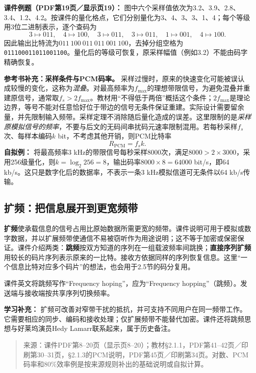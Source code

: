 \textbf{课件例题（PDF第19页／显示页19）：} 图中六个采样值依次为3.2、3.9、2.8、3.4、1.2、4.2。按课件的量化格点，它们分别量化为3、4、3、3、1、4；每个等级用3位二进制表示，逐个查码为
\[
3\mapsto011,\quad4\mapsto100,\quad3\mapsto011,\quad3\mapsto011,\quad1\mapsto001,\quad4\mapsto100.
\]
因此输出比特流为$011\ 100\ 011\ 011\ 001\ 100$，去掉分组空格为\texttt{011100011011001100}。量化后的等级可恢复，原采样幅值（例如3.2）不能由码字精确恢复。
\annotationarea[4]

\textbf{参考书补充：采样条件与PCM码率。} 采样过慢时，原来的快速变化可能被误认成较慢的变化，这称为\emph{混叠}。对最高频率为$f_{\max}$的理想带限信号，为避免混叠并重建原信号，通常取$f_s>2f_{\max}$。教材用“不得低于两倍”概括这个条件；$2f_{\max}$是理论边界，等号不能对任意恰好位于带边的信号无条件保证重建。实际设计需要留余量，并先限制输入频带。采样定理不消除随后量化造成的误差。这里限制的是\emph{采样原模拟信号的频率}，不要与后文的无码间串扰码元速率限制混用。若每秒采样$f_s$次、每样本编码$k$ bit，不考虑其他开销，则PCM比特率
\[
 R_{\mathrm{PCM}}=f_sk.
\]
\textbf{自拟例：} 将最高频率3 kHz的带限信号每秒采样8000次，满足$8000>2\times3000$，采用256级量化，则$k=\log_2 256=8$，输出码率$8000\times8=64000$ bit/s，即64 kb/s。这只是数字化后的数据率，不表示一条3 kHz模拟信道可无条件以64 kb/s传输。
\annotationarea[4]

\subsection{扩频：把信息展开到更宽频带}
\textbf{扩频}使承载信息的信号占用比原始数据所需更宽的频带。课件说明可用于模拟或数字数据，并以扩展频带使通信不易被窃听作为用途说明；这不等于加密或保密保证。课件介绍两类：\textbf{跳频}按双方知道的序列在一组载波频率间跳换；\textbf{直接序列扩频}用较长的码片序列表示原来的一比特。接收方依据同样的序列恢复信息。这里“一个信息比特对应多个码片”的想法，也会用于2.5节的码分复用。

课件英文将跳频写作“Frequency hoping”，应为“Frequency hopping”（跳频）。发送端与接收端按共享序列切换频率。

\textbf{学习补充：} 扩频可改善对窄带干扰的抵抗，并可支持不同用户在同一频带工作。它需要相应的同步、编码和接收处理；仅扩展频带不能替代加密。课件还将跳频思想与好莱坞演员Hedy Lamarr联系起来，属于历史备注。

\begin{quote}\small 来源：课件PDF第8--20页（显示页8--20）；教材§2.1.1，PDF第41--42页／印刷第30--31页，§2.1.3的PCM说明，PDF第45页／印刷第34页。对数、PCM码率和80\%效率例是按来源规则补出的基础说明或自拟计算。\end{quote}
\annotationarea[4]

